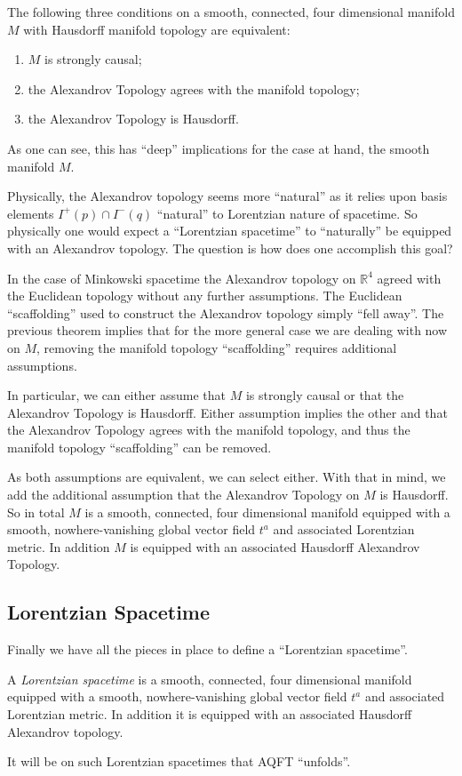 \begin{theorem}
    The following three conditions on a smooth, connected, four dimensional manifold $M$ with Hausdorff manifold topology are equivalent:
    \begin{enumerate}
        \item $M$ is strongly causal;
        \item the Alexandrov Topology agrees with the manifold topology;
        \item the Alexandrov Topology is Hausdorff.
    \end{enumerate}
\end{theorem}

As one can see, this has ``deep'' implications for the case at hand, the smooth manifold $M$.

Physically, the Alexandrov topology seems more ``natural'' as it relies upon basis elements $I^+(p) \cap I^-(q)$ ``natural'' to Lorentzian nature of spacetime. So physically one would expect a ``Lorentzian spacetime'' to ``naturally'' be equipped with an Alexandrov topology. The question is how does one accomplish this goal?

In the case of Minkowski spacetime the Alexandrov topology on $\mathbb{R}^4$ agreed with the Euclidean topology without any further assumptions. The Euclidean ``scaffolding'' used to construct the Alexandrov topology simply ``fell away''. The previous theorem implies that for the more general case we are dealing with now on $M$, removing the manifold topology ``scaffolding'' requires additional assumptions.

In particular, we can either assume that $M$ is strongly causal or that the Alexandrov Topology is Hausdorff. Either assumption implies the other and that the Alexandrov Topology agrees with the manifold topology, and thus the manifold topology ``scaffolding'' can be removed.

As both assumptions are equivalent, we can select either. With that in mind, we add the additional assumption that the Alexandrov Topology on $M$ is Hausdorff. So in total $M$ is a smooth, connected, four dimensional manifold equipped with a smooth, nowhere-vanishing global vector field $t^a$ and associated Lorentzian metric. In addition $M$ is equipped with an associated Hausdorff Alexandrov Topology.

\subsection{Lorentzian Spacetime}
Finally we have all the pieces in place to define a ``Lorentzian spacetime''.

\begin{definition}
    A \textit{Lorentzian spacetime} is a smooth, connected, four dimensional manifold equipped with a smooth, nowhere-vanishing global vector field $t^a$ and associated Lorentzian metric. In addition it is equipped with an associated Hausdorff Alexandrov topology.
\end{definition}

It will be on such Lorentzian spacetimes that AQFT ``unfolds''.
